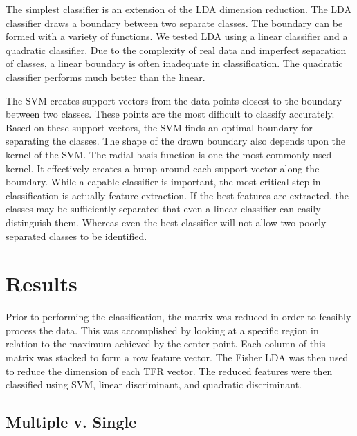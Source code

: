 \documentclass{article}[11pt]
\begin{document}
The simplest classifier is an extension of the LDA dimension reduction. The LDA classifier draws a boundary between two separate classes.  The boundary can be formed with a variety of functions.  We tested LDA using a linear classifier and a quadratic classifier.  Due to the complexity of real data and imperfect separation of classes, a linear boundary is often inadequate in classification. The quadratic classifier performs much better than the linear. 

The SVM creates support vectors from the data points closest to the boundary between two classes.  These points are the most difficult to classify accurately.  Based on these support vectors, the SVM finds an optimal boundary for separating the classes. The shape of the drawn boundary also depends upon the kernel of the SVM. The radial-basis function is one the most commonly used kernel.  It effectively creates a bump around each support vector along the boundary. 
While a capable classifier is important, the most critical step in classification is actually feature extraction.  If the best features are extracted, the classes may be sufficiently separated that even a linear classifier can easily distinguish them.  Whereas even the best classifier will not allow two poorly separated classes to be identified.

\section{Results}
\label{sec:results}
Prior to performing the classification, the matrix was reduced in order to feasibly process the data. This was accomplished by looking at a specific region in relation to the maximum achieved by the center point.  Each column of this matrix was stacked to form a row feature vector.  The Fisher LDA was then used to reduce the dimension of each TFR vector. The reduced features were then classified using SVM, linear discriminant, and quadratic discriminant.
\subsection{Multiple v. Single}
\end{document}

